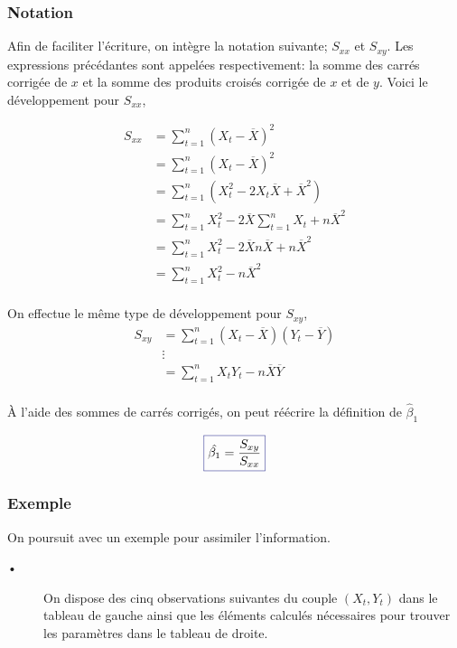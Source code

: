 \documentclass[11pt,french]{report}
\begin{document}
\subsubsection{Notation}
Afin de faciliter l'écriture, on intègre la notation suivante; $S_{xx}$ et  $S_{xy}$. Les expressions précédantes sont appelées respectivement: la somme des carrés corrigée de $x$ et la somme des produits croisés corrigée de $x$ et de $y$. Voici le développement pour $S_{xx}$,

\begin{align*}
S_{xx} &= \displaystyle\sum_{t=1}^n (X_t - \overline{X})^2 \\
&= \displaystyle\sum_{t=1}^n (X_t - \overline{X})^2 \\
&= \displaystyle\sum_{t=1}^n (X_t^2 - 2X_t\overline{X} + \overline{X}^2) \\
&= \displaystyle\sum_{t=1}^n X_t^2 - 2\overline{X}\displaystyle\sum_{t=1}^n X_t + n\overline{X}^2 \\
&= \displaystyle\sum_{t=1}^n X_t^2 - 2\overline{X}n\overline{X} + n\overline{X}^2 \\
&= \displaystyle\sum_{t=1}^n X_t^2 - n\overline{X}^2 \\
\end{align*}

On effectue le même type de développement pour $S_{xy}$, 
\begin{align*}
S_{xy} &= \displaystyle\sum_{t=1}^n (X_t - \overline{X}) (Y_t - \overline{Y}) \\
&\vdots \\
&= \displaystyle\sum_{t=1}^n X_tY_t - n\overline{X}\overline{Y}\\
\end{align*}

À l'aide des sommes de carrés corrigés, on peut réécrire la définition de $\hat{\beta}_1$

\begin{equation}
\label{eq:beta1SXY}
\color{Blue}
\boxed{\color{black}
\hat{\beta_1} = \frac{S_{xy}}{S_{xx}}
}
\end{equation}

\bigskip
\subsubsection{Exemple}
\label{exemple1}
On poursuit avec un exemple pour assimiler l'information.

\bigskip
\begin{description}
\item[•] On dispose des cinq observations suivantes du couple $(X_t, Y_t)$ dans le tableau de gauche ainsi que les éléments calculés nécessaires pour trouver les paramètres dans le tableau de droite.
\end{description}
\end{document}
